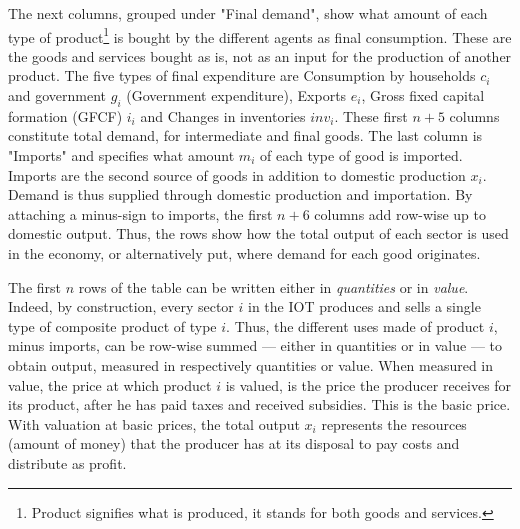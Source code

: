 \documentclass[12pt,english]{article}
\begin{document}
The next columns, grouped under "Final demand", show what amount of each type of product\footnote{Product signifies what is produced, it stands for both goods and services.} is bought by the different agents as final consumption. These are the goods and services bought as is, not as an input for the production of another product. The five types of final expenditure are Consumption by households $c_i$ and government $g_i$ (Government expenditure), Exports $e_i$, Gross fixed capital formation (GFCF) $i_i$ and Changes in inventories $inv_i$. These first $n+5$ columns constitute total demand, for intermediate and final goods. The last column is "Imports" and specifies what amount $m_i$ of each type of good is imported. Imports are the second source of goods in addition to domestic production $x_i$. Demand is thus supplied through domestic production and importation. By attaching a minus-sign to imports, the first $n+6$ columns add row-wise up to domestic output. Thus, the rows show how the total output of each sector is used in the economy, or alternatively put, where demand for each good originates.

The first $n$ rows of the table can be written either in \emph{quantities} or in \emph{value}. Indeed, by construction, every sector $i$ in the IOT produces and sells a single type of composite product of type $i$. Thus, the different uses made of product $i$, minus imports, can be row-wise summed --- either in quantities or in value --- to obtain output, measured in respectively quantities or value. When measured in value, the price at which product $i$ is valued, is the price the producer receives for its product, after he has paid taxes and received subsidies. This is the basic price. %
With valuation at basic prices, the total output $x_i$ represents %
the %
resources (amount of money) that the producer has at its disposal to pay costs and distribute as profit. %
\end{document}
